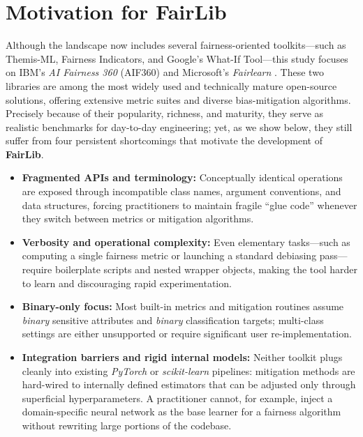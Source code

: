 \documentclass[12pt,a4paper,openright,twoside]{book}
\begin{document}
\section{Motivation for FairLib}
Although the landscape now includes several fairness-oriented toolkits—such as Themis-ML, Fairness Indicators, and Google’s What-If Tool—this study focuses on IBM’s \textit{AI Fairness 360} (AIF360) \cite{bellamy2019aif360} and Microsoft’s \textit{Fairlearn} \cite{bird2020fairlearn}. These two libraries are among the most widely used and technically mature open-source solutions, offering extensive metric suites and diverse bias-mitigation algorithms. Precisely because of their popularity, richness, and maturity, they serve as realistic benchmarks for day-to-day engineering; yet, as we show below, they still suffer from four persistent shortcomings that motivate the development of \textbf{FairLib}.

\begin{itemize}
  \item \textbf{Fragmented APIs and terminology:}  
  Conceptually identical operations are exposed through incompatible
  class names, argument conventions, and data structures, forcing practitioners
  to maintain fragile “glue code” whenever they switch between metrics or
  mitigation algorithms.

  \item \textbf{Verbosity and operational complexity:}  
  Even elementary tasks—such as computing a single fairness metric or launching
  a standard debiasing pass—require boilerplate scripts and nested wrapper
  objects, making the tool harder to learn and discouraging rapid experimentation.

  \item \textbf{Binary-only focus:}
  Most built-in metrics and mitigation routines assume \emph{binary} sensitive
  attributes and \emph{binary} classification targets; multi-class settings are
  either unsupported or require significant user re-implementation.

  \item \textbf{Integration barriers and rigid internal models:}  
  Neither toolkit plugs cleanly into existing \textit{PyTorch} or
  \textit{scikit-learn} pipelines: mitigation methods are hard-wired to
  internally defined estimators that can be adjusted only through superficial
  hyperparameters.  A practitioner cannot, for example, inject a
  domain-specific neural network as the base learner for a fairness algorithm
  without rewriting large portions of the codebase.
\end{itemize}
\end{document}
